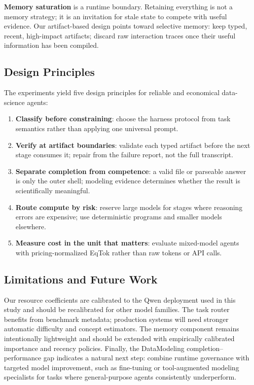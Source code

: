 \documentclass[letterpaper]{article} %
\begin{document}
\textbf{Memory saturation} is a runtime boundary.  Retaining everything is not a memory strategy; it is an invitation for stale state to compete with useful evidence.  Our artifact-based design points toward selective memory: keep typed, recent, high-impact artifacts; discard raw interaction traces once their useful information has been compiled.

\subsection{Design Principles}

The experiments yield five design principles for reliable and economical data-science agents:

\begin{enumerate}
    \item \textbf{Classify before constraining}: choose the harness protocol from task semantics rather than applying one universal prompt.
    \item \textbf{Verify at artifact boundaries}: validate each typed artifact before the next stage consumes it; repair from the failure report, not the full transcript.
    \item \textbf{Separate completion from competence}: a valid file or parseable answer is only the outer shell; modeling evidence determines whether the result is scientifically meaningful.
    \item \textbf{Route compute by risk}: reserve large models for stages where reasoning errors are expensive; use deterministic programs and smaller models elsewhere.
    \item \textbf{Measure cost in the unit that matters}: evaluate mixed-model agents with pricing-normalized EqTok rather than raw tokens or API calls.
\end{enumerate}

\subsection{Limitations and Future Work}

Our resource coefficients are calibrated to the Qwen deployment used in this study and should be recalibrated for other model families.  The task router benefits from benchmark metadata; production systems will need stronger automatic difficulty and concept estimators.  The memory component remains intentionally lightweight and should be extended with empirically calibrated importance and recency policies.  Finally, the DataModeling completion--performance gap indicates a natural next step: combine runtime governance with targeted model improvement, such as fine-tuning or tool-augmented modeling specialists for tasks where general-purpose agents consistently underperform.
\end{document}
